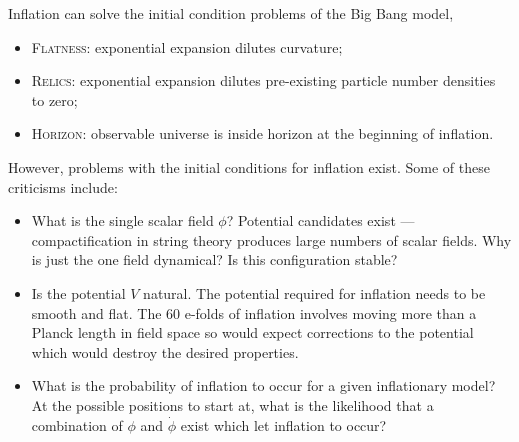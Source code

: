 Inflation can solve the initial condition problems of the Big Bang model, \ie{}
%
\begin{itemize}
	\item \textsc{Flatness}: exponential expansion dilutes curvature;
	\item \textsc{Relics}: exponential expansion dilutes pre-existing particle number densities to zero;
	\item \textsc{Horizon}: observable universe is inside horizon at the beginning of inflation.
\end{itemize}
%
However, problems with the initial conditions for inflation exist.
Some of these criticisms include:
%
\begin{itemize}
	\item What is the single scalar field \({\phi}\)? Potential candidates exist --- compactification in string theory produces large numbers of scalar fields.
	      Why is just the one field dynamical? Is this configuration stable?

	\item Is the potential \(V\) natural.
	      The potential required for inflation needs to be smooth and flat.
	      The \(\num{60}\) e-folds of inflation involves moving more than a Planck length in field space so would expect corrections to the potential which would destroy the desired properties.

	\item What is the probability of inflation to occur for a given inflationary model? At the possible positions to start at, what is the likelihood that a combination of \({\phi}\) and \(\dot{\phi}\) exist which let inflation to occur?
\end{itemize}
